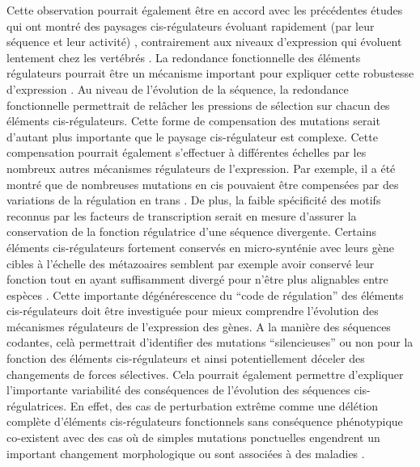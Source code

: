 Cette observation pourrait également être en accord avec les précédentes études qui ont montré des paysages \gls{cis}-régulateurs évoluant rapidement (par leur séquence et leur activité) \citep{cheng_principles_2014, villar_enhancer_2015}, contrairement aux niveaux d’expression qui évoluent lentement chez les vertébrés \citep{brawand_evolution_2011, cardoso-moreira_gene_2019, berthelot_complexity_2018}. La redondance fonctionnelle des éléments régulateurs pourrait être un mécanisme important pour expliquer cette robustesse d’expression \citep{berthelot_complexity_2018, osterwalder_enhancer_2018, kvon_enhancer_2021}. Au niveau de l’évolution de la séquence, la redondance fonctionnelle permettrait de relâcher les pressions de sélection sur chacun des éléments \gls{cis}-régulateurs. Cette forme de compensation des mutations serait d’autant plus importante que le paysage \gls{cis}-régulateur est complexe. Cette compensation pourrait également s’effectuer à différentes échelles par les nombreux autres mécanismes régulateurs de l’expression. Par exemple, il a été montré que de nombreuses mutations en cis pouvaient être compensées par des variations de la régulation en \gls{trans} \citep{goncalves_extensive_2012, mack_gene_2016}. De plus, la faible spécificité des motifs reconnus par les facteurs de transcription serait en mesure d’assurer la conservation de la fonction régulatrice d’une séquence divergente. Certains éléments \gls{cis}-régulateurs fortement conservés en micro-synténie avec leurs gène cibles à l’échelle des métazoaires semblent par exemple avoir conservé leur fonction tout en ayant suffisamment divergé pour n’être plus alignables entre espèces \citep{wong_deep_2020}. Cette importante dégénérescence du “code de régulation” des éléments \gls{cis}-régulateurs doit être investiguée pour mieux comprendre l’évolution des mécanismes régulateurs de l’expression des gènes. A la manière des séquences codantes, celà permettrait d’identifier des mutations “silencieuses” ou non pour la fonction des éléments \gls{cis}-régulateurs et ainsi potentiellement déceler des changements de forces sélectives. Cela pourrait également permettre d’expliquer l’importante variabilité des conséquences de l’évolution des séquences \gls{cis}-régulatrices. En effet, des cas de perturbation extrême comme une délétion complète d’éléments \gls{cis}-régulateurs fonctionnels sans conséquence phénotypique \citep{osterwalder_enhancer_2018} co-existent avec des cas où de simples mutations ponctuelles engendrent un important changement morphologique ou sont associées à des maladies \citep{corradin_enhancer_2014, kvon_progressive_2016}. 

